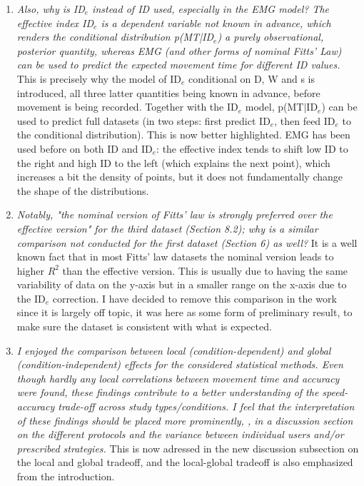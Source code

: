 \documentclass{article}
\begin{document}
\begin{enumerate}
    
    
    
    \item \textit{Also, why is ID$_e$ instead of ID used, especially in the EMG model? The effective index ID$_e$ is a dependent variable not known in advance, which renders the conditional distribution p(MT|ID$_e$) a purely observational, posterior quantity, whereas EMG (and other forms of nominal Fitts' Law) can be used to predict the expected movement time for different ID values. } This is precisely why the model of ID$_e$ conditional on D, W and s is introduced, all three latter quantities being known in advance, before movement is being recorded. Together with the ID$_e$ model, p(MT$\mid$ID$_e$) can be used to predict full datasets (in two steps: first predict ID$_e$, then feed ID$_e$ to the conditional distribution). This is now better highlighted.    
    EMG has been used before on both ID and ID$_e$: the effective index tends to shift low ID to the right and high ID to the left (which explains the next point), which increases a bit the density of points, but it does not fundamentally change the shape of the distributions. 
    \item \textit{Notably, "the nominal version of Fitts' law is strongly preferred over the effective version" for the third dataset (Section 8.2); why is a similar comparison not conducted for the first dataset (Section 6) as well?} It is a well known fact that in most Fitts' law datasets the nominal version leads to higher $R^2$ than the effective version. This is usually due to having the same variability of data on the y-axis but in a smaller range on the x-axis due to the ID$_e$ correction. I have decided to remove this comparison in the work since it is largely off topic, it was here as some form of preliminary result, to make sure the dataset is consistent with what is expected.
    \item \textit{I enjoyed the comparison between local (condition-dependent) and global (condition-independent) effects for the considered statistical methods. Even though hardly any local correlations between movement time and accuracy were found, these findings contribute to a better understanding of the speed-accuracy trade-off across study types/conditions. I feel that the interpretation of these findings should be placed more prominently, \eg, in a discussion section on the different protocols and the variance between individual users and/or prescribed strategies.} This is now adressed in the new discussion subsection on the local and global tradeoff, and the local-global tradeoff is also emphasized from the introduction.

\end{enumerate}
\end{document}
